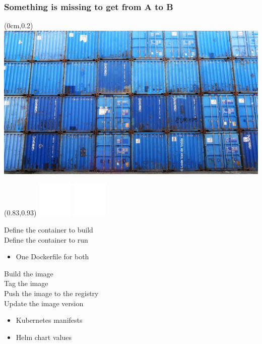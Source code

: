 \documentclass[aspectratio=169,11pt,hyperref={colorlinks=true}]{beamer}
\begin{document}
\begin{blackframe}
  \frametitle{Something is missing to get from A to B}
  \begin{textblock*}{\paperwidth}(0cm,0.2\paperheight)
    \includegraphics[width=\paperwidth]{img/blue-containers.jpg}
  \end{textblock*}
  \begin{textblock*}{0.2\paperwidth}(0.83\paperwidth,0.93\paperheight)
    \includegraphics[width=0.03\paperwidth]{img/cc.png}
    \includegraphics[width=0.03\paperwidth]{img/zero.png}
  \end{textblock*}
\end{blackframe}

\begin{stripedframe}%
  {
    Define the container to build \\
    Define the container to run \\
    \begin{itemize}
      \item One Dockerfile for both
    \end{itemize}
  }%
  {
    \vspace{30pt}
    \setlststyledark
    
    \setlststyle
  }%
  {
    Build the image \\
    Tag the image \\
    Push the image to the registry \\
    Update the image version \\
    \begin{itemize}
      \item Kubernetes manifests
      \item Helm chart values
    \end{itemize}
  }%
  {
    \vspace{30pt}
    \setlststyledark
    
    \setlststyle
  }%
\end{stripedframe}
\end{document}
